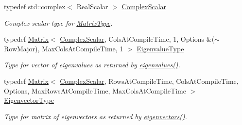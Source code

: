 \begin{DoxyCompactItemize}
\item 
typedef std\+::complex$<$ Real\+Scalar $>$ \mbox{\hyperlink{class_eigen_1_1_complex_eigen_solver_a3604c99a69fac3bee42c88cb2b589143}{Complex\+Scalar}}
\begin{DoxyCompactList}\small\item\em Complex scalar type for \mbox{\hyperlink{class_eigen_1_1_complex_eigen_solver_ad61f6278843a601096276c9a72c0252f}{Matrix\+Type}}. \end{DoxyCompactList}\item 
typedef \mbox{\hyperlink{class_eigen_1_1_matrix}{Matrix}}$<$ \mbox{\hyperlink{class_eigen_1_1_complex_eigen_solver_a3604c99a69fac3bee42c88cb2b589143}{Complex\+Scalar}}, Cols\+At\+Compile\+Time, 1, Options \&($\sim$Row\+Major), Max\+Cols\+At\+Compile\+Time, 1 $>$ \mbox{\hyperlink{class_eigen_1_1_complex_eigen_solver_ad3a663b1ff5200a098dabbbf9b7162b1}{Eigenvalue\+Type}}
\begin{DoxyCompactList}\small\item\em Type for vector of eigenvalues as returned by \mbox{\hyperlink{class_eigen_1_1_complex_eigen_solver_a10c25c7620e7faedcd39991cce3a757b}{eigenvalues()}}. \end{DoxyCompactList}\item 
typedef \mbox{\hyperlink{class_eigen_1_1_matrix}{Matrix}}$<$ \mbox{\hyperlink{class_eigen_1_1_complex_eigen_solver_a3604c99a69fac3bee42c88cb2b589143}{Complex\+Scalar}}, Rows\+At\+Compile\+Time, Cols\+At\+Compile\+Time, Options, Max\+Rows\+At\+Compile\+Time, Max\+Cols\+At\+Compile\+Time $>$ \mbox{\hyperlink{class_eigen_1_1_complex_eigen_solver_a67cd4d20590abfd86b2639c4c8ea3dd6}{Eigenvector\+Type}}
\begin{DoxyCompactList}\small\item\em Type for matrix of eigenvectors as returned by \mbox{\hyperlink{class_eigen_1_1_complex_eigen_solver_a3aa5e27800349990778da8fa532c1270}{eigenvectors()}}. \end{DoxyCompactList}\end{DoxyCompactItemize}
